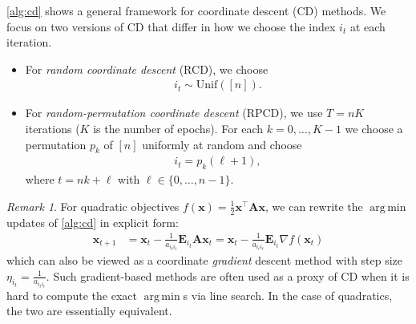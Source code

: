 \documentclass{article}
\theoremstyle{plain}
\theoremstyle{definition}
\theoremstyle{remark}
\newtheorem*{remark*}{Remark} %
\def\inner#1{\left\langle#1\right\rangle}
\def\ve{{\bm{e}}}
\def\vx{{\bm{x}}}
\def\mA{{\bm{A}}}
\def\mE{{\bm{E}}}
\DeclareMathOperator*{\argmin}{arg\,min}
\begin{document}
\cref{alg:cd} shows a general framework for coordinate descent (CD) methods.
We focus on two versions of CD that differ in how we choose the index $i_t$ at each iteration.
\begin{itemize}[topsep=0pt,itemsep=0pt]
    \item For \emph{random coordinate descent} (RCD), we choose
    \begin{align}
        i_t \sim \text{Unif}([n]). \label{eq:rcdindex}
    \end{align}
    \item For \emph{random-permutation coordinate descent} (RPCD), we use $T = nK$ iterations ($K$ is the number of epochs).
    For each $k = 0, \dots, K-1$ we choose a permutation $p_k$ of $[n]$ uniformly at random and choose
    \begin{align}
        i_t = p_k(\ell+1), \label{eq:rpcdindex}
    \end{align}
    where $t = nk + \ell$ with $\ell \in \{0, \dots, n-1\}$.
\end{itemize}

\begin{remark*}
    For quadratic objectives $f(\vx) = \frac{1}{2} \vx^{\top} \mA \vx$, we can rewrite the $\argmin$ updates of \cref{alg:cd} in explicit form:
    \begin{align*}
        \vx_{t+1} &= \vx_{t} - \frac{1}{a_{i_t i_t}} \mE_{i_t} \mA \vx_{t} = \vx_{t} - \frac{1}{a_{i_t i_t}} \mE_{i_t} \nabla f (\vx_{t})
    \end{align*}
    which can also be viewed as a coordinate \emph{gradient} descent method with step size $\eta_{i_t} = \frac{1}{a_{i_t i_t}}$.
    Such gradient-based methods are often used as a proxy of CD when it is hard to compute the exact $\argmin$s via line search.
    In the case of quadratics, the two are essentially equivalent.
\end{remark*}
\end{document}
